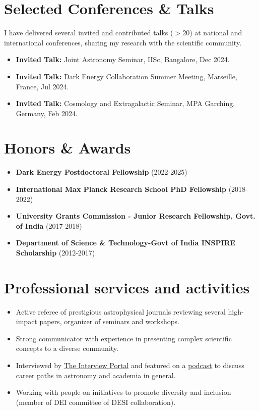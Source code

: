 \documentclass[a4paper,11pt]{article}
\begin{document}
\section*{Selected Conferences \& Talks}
I have delivered several invited and contributed talks ($>20$) at national and international conferences, sharing my research with the scientific community.
\begin{itemize}[noitemsep, topsep=0pt]
\item \textbf{Invited Talk:} Joint Astronomy Seminar, IISc, Bangalore, Dec 2024.
\item \textbf{Invited Talk:} Dark Energy Collaboration Summer Meeting, Marseille, France, Jul 2024.
    \item \textbf{Invited Talk:} Cosmology and Extragalactic Seminar, MPA Garching, Germany, Feb 2024.
\end{itemize}

\section*{Honors \& Awards}
\begin{itemize}[noitemsep, topsep=0pt]
 \item \textbf{Dark Energy Postdoctoral Fellowship} (2022-2025)
    \item \textbf{International Max Planck Research School PhD Fellowship} (2018–2022)
    \item \textbf{University Grants Commission - Junior Research Fellowship, Govt. of India} (2017-2018)
     \item \textbf{Department of Science \& Technology-Govt of India INSPIRE Scholarship}  (2012-2017)
\end{itemize}

\section*{Professional services and activities}
\begin{itemize}[noitemsep, topsep=0pt]
    \item Active referee of prestigious astrophysical journals reviewing several high-impact papers, organizer of seminars and workshops.
     \item Strong communicator with experience in presenting complex scientific concepts to a diverse community.
    \item Interviewed by \href{https://theinterviewportal.com/2020/03/13/astrophysicist-interview-8/}{The Interview Portal} and featured on a \href{https://www.youtube.com/watch?v=WmA_PnYLeCg}{podcast} to discuss career paths in astronomy and academia in general.
    \item Working with people on initiatives to promote diversity and inclusion (member of DEI committee
of DESI collaboration).
\end{itemize}
\end{document}
